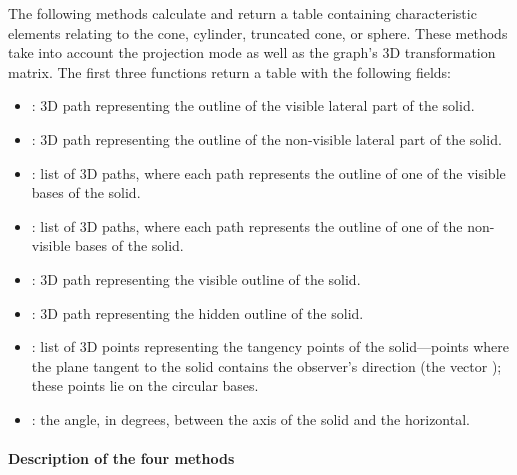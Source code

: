 The following methods calculate and return a table containing characteristic elements relating to the cone, cylinder, truncated cone, or sphere. These methods take into account the projection mode as well as the graph's 3D transformation matrix. The first three functions return a table with the following fields:

\begin{itemize}
    \item {}: 3D path representing the outline of the visible lateral part of the solid. 
    \item {}: 3D path representing the outline of the non-visible lateral part of the solid. 
    \item {}: list of 3D paths, where each path represents the outline of one of the visible bases of the solid. 
    \item {}: list of 3D paths, where each path represents the outline of one of the non-visible bases of the solid. 
    \item {}: 3D path representing the visible outline of the solid. 
    \item {}: 3D path representing the hidden outline of the solid. 
    \item {}: list of 3D points representing the tangency points of the solid—points where the plane tangent to the solid contains the observer's direction (the vector ); these points lie on the circular bases. 
    \item {}: the angle, in degrees, between the axis of the solid and the horizontal.
\end{itemize}

\paragraph{Description of the four methods}

